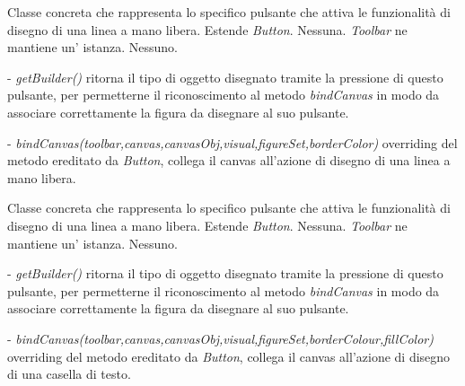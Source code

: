 Classe concreta che rappresenta lo specifico pulsante che attiva le funzionalit\` a di disegno di una linea a mano libera.
Estende \textit{Button}.
Nessuna.
\textit{Toolbar} ne mantiene un' istanza.
Nessuno.
\begin{elencopuntato}[\subsubsecindent]
\item[-] \textit{getBuilder()} ritorna il tipo di oggetto disegnato tramite la pressione di questo pulsante, per permetterne il riconoscimento al metodo \textit{bindCanvas} in modo da associare correttamente la figura da disegnare al suo pulsante.
\item[-]  \textit{bindCanvas(toolbar,canvas,canvasObj,visual,figureSet,borderColor)} overriding del metodo ereditato da \textit{Button}, collega il canvas all'azione di disegno di una linea a mano libera.
\end{elencopuntato}


Classe concreta che rappresenta lo specifico pulsante che attiva le funzionalit\` a di disegno di una linea a mano libera.
Estende \textit{Button}.
Nessuna.
\textit{Toolbar} ne mantiene un' istanza.
Nessuno.
\begin{elencopuntato}[\subsubsecindent]
\item[-] \textit{getBuilder()} ritorna il tipo di oggetto disegnato tramite la pressione di questo pulsante, per permetterne il riconoscimento al metodo \textit{bindCanvas} in modo da associare correttamente la figura da disegnare al suo pulsante.
\item[-]  \textit{bindCanvas(toolbar,canvas,canvasObj,visual,figureSet,borderColour,fillColor)} overriding del metodo ereditato da \textit{Button}, collega il canvas all'azione di disegno di una casella di testo. 
\end{elencopuntato}

